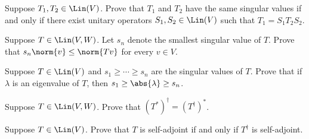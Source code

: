 \begin{exercise}
Suppose $T_1,T_2\in\Lin(V)$. Prove that $T_1$ and $T_2$ have the same singular
values if and only if there exist unitary operators $S_1,S_2\in\Lin(V)$ such
that $T_1=S_1T_2S_2$.
\end{exercise}

\begin{exercise}
Suppose $T\in\Lin(V,W)$. Let $s_n$ denote the smallest singular value of $T$.
Prove that $s_n\norm{v}\le\norm{Tv}$ for every $v\in V$.
\end{exercise}

\begin{exercise}
Suppose $T\in\Lin(V)$ and $s_1\ge\cdots\ge s_n$ are the singular values of $T$.
Prove that if $\lambda$ is an eigenvalue of $T$, then
$s_1\ge\abs{\lambda}\ge s_n$.
\end{exercise}

\begin{exercise}
Suppose $T\in\Lin(V,W)$. Prove that $(T^*)^\dagger=(T^\dagger)^*$.
\end{exercise}

\begin{exercise}
Suppose $T\in\Lin(V)$. Prove that $T$ is self-adjoint if and only if
$T^\dagger$ is self-adjoint.
\end{exercise}

